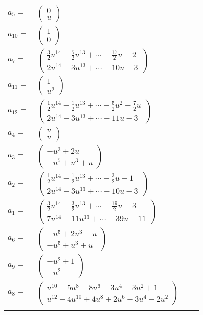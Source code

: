 \documentclass[1p]{elsarticle_modified}
\theoremstyle{definition}
\begin{document}
\begin{tabular}{m{7pt} m{180pt} m{7pt} m{180pt} }
\flushright $a_{5}=$&$\begin{pmatrix}0\\u\end{pmatrix}$ \\
\flushright $a_{10}=$&$\begin{pmatrix}1\\0\end{pmatrix}$ \\
\flushright $a_{7}=$&$\begin{pmatrix}\frac{3}{2} u^{14}-\frac{5}{2} u^{13}+\cdots-\frac{17}{2} u-2\\2 u^{14}-3 u^{13}+\cdots-10 u-3\end{pmatrix}$ \\
\flushright $a_{11}=$&$\begin{pmatrix}1\\u^2\end{pmatrix}$ \\
\flushright $a_{12}=$&$\begin{pmatrix}\frac{1}{2} u^{14}-\frac{1}{2} u^{13}+\cdots-\frac{5}{2} u^2-\frac{7}{2} u\\2 u^{14}-3 u^{13}+\cdots-11 u-3\end{pmatrix}$ \\
\flushright $a_{4}=$&$\begin{pmatrix}u\\u\end{pmatrix}$ \\
\flushright $a_{3}=$&$\begin{pmatrix}- u^3+2 u\\- u^5+u^3+u\end{pmatrix}$ \\
\flushright $a_{2}=$&$\begin{pmatrix}\frac{1}{2} u^{14}-\frac{1}{2} u^{13}+\cdots-\frac{3}{2} u-1\\2 u^{14}-3 u^{13}+\cdots-10 u-3\end{pmatrix}$ \\
\flushright $a_{1}=$&$\begin{pmatrix}\frac{3}{2} u^{14}-\frac{3}{2} u^{13}+\cdots-\frac{19}{2} u-3\\7 u^{14}-11 u^{13}+\cdots-39 u-11\end{pmatrix}$ \\
\flushright $a_{6}=$&$\begin{pmatrix}- u^5+2 u^3- u\\- u^5+u^3+u\end{pmatrix}$ \\
\flushright $a_{9}=$&$\begin{pmatrix}- u^2+1\\- u^2\end{pmatrix}$ \\
\flushright $a_{8}=$&$\begin{pmatrix}u^{10}-5 u^8+8 u^6-3 u^4-3 u^2+1\\u^{12}-4 u^{10}+4 u^8+2 u^6-3 u^4-2 u^2\end{pmatrix}$\\&\end{tabular}
\end{document}
